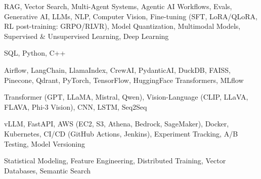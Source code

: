 \documentclass[letter,10pt]{article}
\begin{document}
 RAG, Vector Search, Multi-Agent Systems, Agentic AI Workflows, Evals, Generative AI, LLMs, NLP, Computer Vision, Fine-tuning (SFT, LoRA/QLoRA, RL post-training: GRPO/RLVR), Model Quantization, Multimodal Models, Supervised \& Unsupervised Learning, Deep Learning\par\vspace{2pt}

 SQL, Python, C++\par\vspace{2pt}

 Airflow, LangChain, LlamaIndex, CrewAI, PydanticAI, DuckDB, FAISS, Pinecone, Qdrant, PyTorch, TensorFlow, HuggingFace Transformers, MLflow\par\vspace{2pt}

 Transformer (GPT, LLaMA, Mistral, Qwen), Vision-Language (CLIP, LLaVA, FLAVA, Phi-3 Vision), CNN, LSTM, Seq2Seq\par\vspace{2pt}

 vLLM, FastAPI, AWS (EC2, S3, Athena, Bedrock, SageMaker), Docker, Kubernetes, CI/CD (GitHub Actions, Jenkins), Experiment Tracking, A/B Testing, Model Versioning\par\vspace{2pt}

 Statistical Modeling, Feature Engineering, Distributed Training, Vector Databases, Semantic Search
\end{document}
